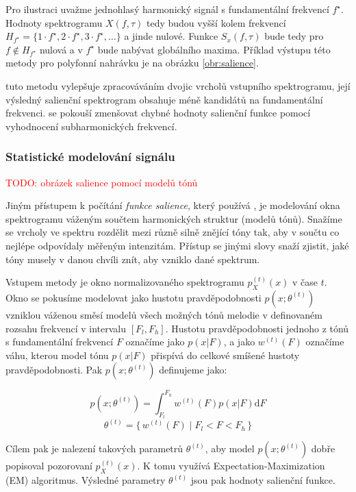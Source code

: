 Pro ilustraci uvažme jednohlasý harmonický signál s fundamentální frekvencí $f^\star$. Hodnoty spektrogramu $X(f, \tau)$ tedy budou vyšší kolem frekvencí $H_{f^\star} = \{1\cdot f^\star, 2\cdot f^\star, 3\cdot f^\star, \dots\}$ a jinde nulové. Funkce $S_x(f, \tau)$ bude tedy pro $f \not\in H_{f^\star}$ nulová a v $f^\star$ bude nabývat globálního maxima. Příklad výstupu této metody pro polyfonní nahrávku je na obrázku \ref{obr:salience}.

\cite{Dressler2011} tuto metodu vylepšuje zpracováváním dvojic vrcholů vstupního spektrogramu, její výsledný salienční spektrogram obsahuje méně kandidátů na fundamentální frekvenci. \cite{Cancela2008} se pokouší zmenšovat chybné hodnoty salienční funkce pomocí vyhodnocení subharmonických frekvencí.

\subsubsection{Statistické modelování signálu}

\textcolor{red}{TODO: obrázek salience pomocí modelů tónů}

Jiným přístupem k počítání \emph{funkce salience}, který používá \cite{Goto1999}, je modelování okna spektrogramu váženým součtem harmonických struktur (modelů tónů). Snažíme se vrcholy ve spektru rozdělit mezi různě silně znějící tóny tak, aby v součtu co nejlépe odpovídaly měřeným intenzitám. Přístup se jinými slovy snaží zjistit, jaké tóny musely v danou chvíli znít, aby vzniklo dané spektrum. 

Vstupem metody je okno normalizovaného spektrogramu $p_X^{(t)}(x)$ v čase $t$. Okno se pokusíme modelovat jako hustotu pravděpodobnosti $p(x; \theta^{(t)})$ vzniklou váženou směsí modelů všech možných tónů melodie v definovaném rozsahu frekvencí v intervalu $[F_l, F_h]$. Hustotu pravděpodobnosti jednoho z tónů s fundamentální frekvencí $F$ označíme jako $p(x|F)$, a jako $w^{(t)}(F)$ označíme váhu, kterou model tónu $p(x|F)$ přispívá do celkové smíšené hustoty pravděpodobnosti. Pak $p(x; \theta^{(t)})$ definujeme jako:

$$p(x; \theta^{(t)}) = \int_{F_l}^{F_h}{w^{(t)}(F)p(x|F) \mathrm{d}F}$$
$$\theta^{(t)} = \{\, w^{(t)}(F) \mid F_l < F < F_h \,\}$$

Cílem pak je nalezení takových parametrů $\theta^{(t)}$, aby model $p(x; \theta^{(t)})$ dobře popisoval pozorovaní $p_X^{(t)}(x)$. K tomu \cite{Goto1999} využívá Expectation-Maximization (EM) algoritmus. Výsledné parametry $\theta^{(t)}$ jsou pak hodnoty salienční funkce.

